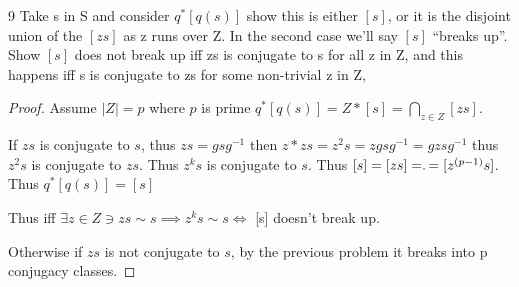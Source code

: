 \documentclass{article}
\begin{document}
\bigskip

\begin{PROB}{9}\label{Problem 9.}
    Take s in S and consider  $q^*[q(s)]$ show this is either $[s]$, or it is the disjoint union of the $[zs]$ as z runs over Z. In the second case we'll say $[s]$ “breaks up”.  Show $[s]$ does not break up iff zs is conjugate to s for all z in Z, and this happens iff s is conjugate to zs for some non-trivial z in Z,
\end{PROB}
\begin{proof}
    Assume $|Z| = p$ where $p$ is prime
    $q^*[q(s)] = Z * [s] = \bigcap_{z \in Z}[zs]$. 
    
    If $zs$ is conjugate to $s$, thus $zs = gsg^{-1}$ then $z*zs = z^2s = zgsg^{-1} = gzsg^{-1}$ thus $z^2s$ is conjugate to $zs$. Thus $z^k s$ is conjugate to $s$. Thus $[s] = [zs] = \ldotp = [z^{(p-1)}s]$. Thus $q^*[q(s)] = [s]$

    Thus iff $\exists z \in Z \ni zs \sim s \implies z^ks \sim s \iff$ [s] doesn't break up.

    Otherwise if $zs$ is not conjugate to $s$, by the previous problem it breaks into p conjugacy classes.

    
\end{proof}
\end{document}
